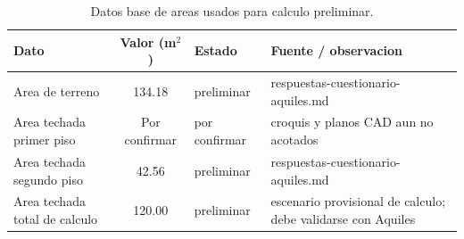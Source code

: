 \begin{table}[H]
\centering
\caption{Datos base de areas usados para calculo preliminar.}
\label{tab:areas_base_calculo}
\begin{small}
\begin{tabularx}{\textwidth}{l c l L}
\toprule
\textbf{Dato} & \textbf{Valor (m$^2$)} & \textbf{Estado} & \textbf{Fuente / observacion} \\
\midrule
Area de terreno & 134.18 & preliminar & respuestas-cuestionario-aquiles.md \\
Area techada primer piso & Por confirmar & por confirmar & croquis y planos CAD aun no acotados \\
Area techada segundo piso & 42.56 & preliminar & respuestas-cuestionario-aquiles.md \\
Area techada total de calculo & 120.00 & preliminar & escenario provisional de calculo; debe validarse con Aquiles \\
\bottomrule
\end{tabularx}
\end{small}
\end{table}